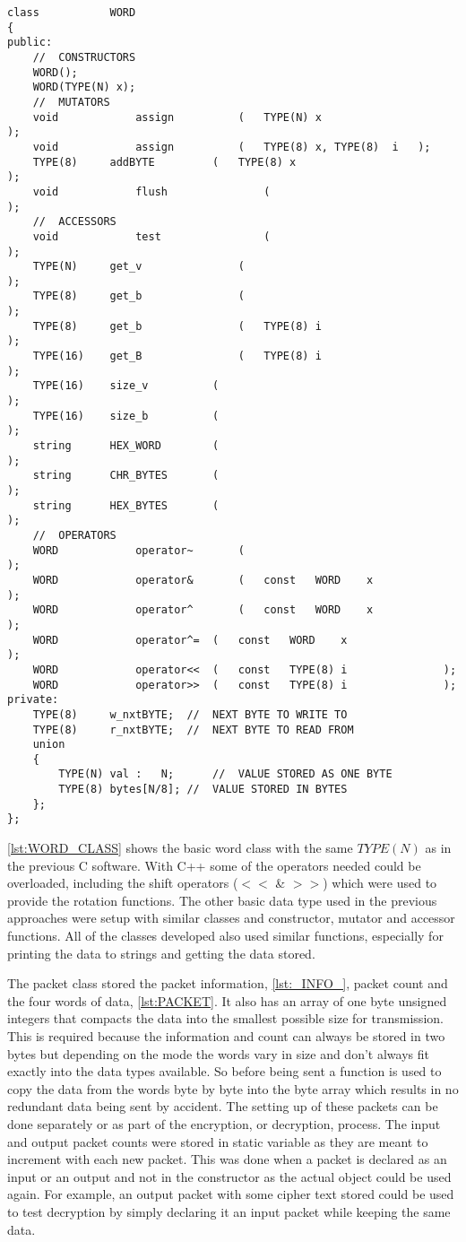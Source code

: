 \documentclass[12pt,twoside,a4paper]{report}
\begin{document}
	\begin{minipage}{\linewidth}
	\begin{lstlisting}[label={lst:WORD_CLASS},caption={Declaration of WORD Class},style=CStyle]
class 			WORD
{
public:
	//	CONSTRUCTORS
	WORD();
	WORD(TYPE(N) x);
	//	MUTATORS
	void			assign			(	TYPE(N)	x							);
	void			assign			(	TYPE(8)	x, TYPE(8)	i	);
	TYPE(8)		addBYTE			(	TYPE(8)	x							);
	void			flush				(												);
	//	ACCESSORS
	void			test				(												);
	TYPE(N)		get_v				(												);
	TYPE(8)		get_b				(												);
	TYPE(8)		get_b				(	TYPE(8)	i							);
	TYPE(16)	get_B				(	TYPE(8)	i							);
	TYPE(16)	size_v			(												);
	TYPE(16)	size_b			(												);
	string		HEX_WORD		(												);
	string		CHR_BYTES		(												);
	string		HEX_BYTES		(												);
	//	OPERATORS
	WORD			operator~		(												);
	WORD			operator&		(	const	WORD	x					);
	WORD			operator^		(	const	WORD	x					);
	WORD			operator^=	(	const	WORD	x					);
	WORD			operator<<	(	const	TYPE(8)	i				);
	WORD			operator>>	(	const	TYPE(8)	i				);
private:
	TYPE(8)		w_nxtBYTE;	//	NEXT BYTE TO WRITE TO
	TYPE(8)		r_nxtBYTE;	//	NEXT BYTE TO READ FROM
	union
	{
		TYPE(N)	val	:	N;		//	VALUE STORED AS ONE BYTE
		TYPE(8)	bytes[N/8];	//	VALUE STORED IN BYTES
	};
};
	\end{lstlisting}
	\end{minipage}
	
	\autoref{lst:WORD_CLASS} shows the basic word class with the same $TYPE(N)$ as in the previous C software. With C++ some of the operators needed could be overloaded, including the shift operators ($<<$ \& $>>$) which were used to provide the rotation functions. The other basic data type used in the previous approaches were setup with similar classes and constructor, mutator and accessor functions. All of the classes developed also used similar functions, especially for printing the data to strings and getting the data stored.
    
   	The packet class stored the packet information, \autoref{lst:_INFO_}, packet count and the four words of data, \autoref{lst:PACKET}. It also has an array of one byte unsigned integers that compacts the data into the smallest possible size for transmission. This is required because the information and count can always be stored in two bytes but depending on the mode the words vary in size and don't always fit exactly into the data types available. So before being sent a function is used to copy the data from the words byte by byte into the byte array which results in no redundant data being sent by accident. The setting up of these packets can be done separately or as part of the encryption, or decryption, process. The input and output packet counts were stored in static variable as they are meant to increment with each new packet. This was done when a packet is declared as an input or an output and not in the constructor as the actual object could be used again. For example, an output packet with some cipher text stored could be used to test decryption by simply declaring it an input packet while keeping the same data.
\end{document}
